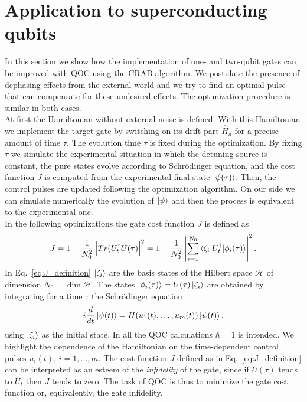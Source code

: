 \documentclass[../main/main.tex]{subfiles}
\begin{document}
\section{Application to superconducting qubits} \label{sect:optimization_superconducting_qubits}
In this section we show how the implementation of one- and two-qubit gates can be improved with QOC using the CRAB algorithm. We postulate the presence of dephasing effects from the external world and we try to find an optimal pulse that can compensate for these undesired effects. The optimization procedure is similar in both cases.\\
At first the Hamiltonian without external noise is defined. With this Hamiltonian we implement the target gate by switching on its drift part $\hat{H}_d$ for a precise amount of time $\tau$. The evolution time $\tau$ is fixed during the optimization. By fixing $\tau$ we simulate the experimental situation in which the detuning source is constant, the pure states evolve according to Schrödinger equation, and the cost function $J$ is computed from the experimental final state $\ket{\psi (\tau)}$. Then, the control pulses are updated following the optimization algorithm. On our side we can simulate numerically the evolution of $\ket{\psi}$ and then the process is equivalent to the experimental one.\\
In the following optimizations the gate cost function $J$ is defined as
\begin{equation} \label{eq:J_definition}
    J =  1-\frac{1}{N_0^2} \left| Tr( U_t^{\dagger} U(\tau) \right|^2 = 1-\frac{1}{N_0^2} \left| \sum_{i=1}^{N_0} \braket{\zeta_i|U_t^{\dagger}|\phi_i(\tau)} \right|^2.
\end{equation}
In Eq.~\eqref{eq:J_definition} $\ket{\zeta_i}$ are the basis states of the Hilbert space $\mathcal{H}$ of dimension $N_0=\dim \mathcal{H}$. The states $\ket{\phi_i(\tau)}=U(\tau) \ket{\zeta_i}$ are obtained by integrating for a time $\tau$ the Schrödinger equation
\begin{equation} \label{eq:Schrodinger_equation}
    i \frac{d}{dt} \ket{\psi(t)} = H(u_1(t),\dots,u_m(t)) \ket{\psi(t)},
\end{equation}
using $\ket{\zeta_i}$ as the initial state. In all the QOC calculations $\hbar=1$ is intended. We highlight the dependence of the Hamiltonian on the time-dependent control pulses $u_i(t)$, $i=1,\dots,m$. The cost function $J$ defined as in Eq.~\eqref{eq:J_definition} can be interpreted as an esteem of the \textit{infidelity} of the gate, since if $U(\tau)$ tends to $U_t$ then $J$ tends to zero. The task of QOC is thus to minimize the gate cost function or, equivalently, the gate infidelity.
\end{document}
